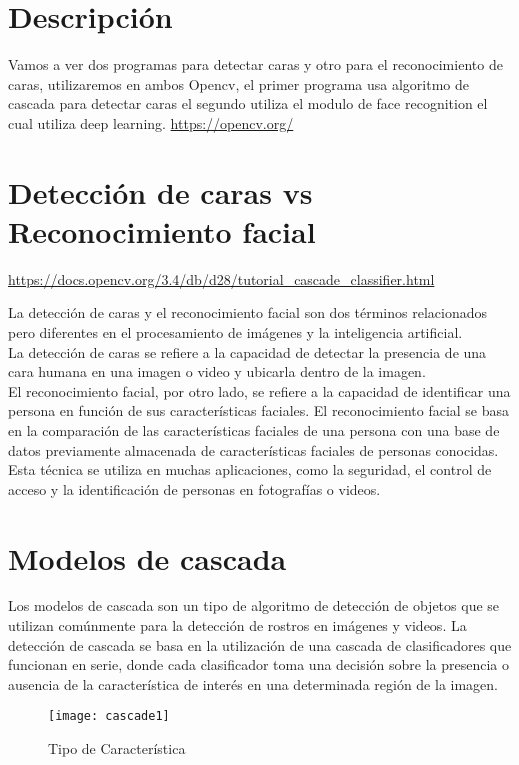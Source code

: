 \section{Descripción}
Vamos a ver dos programas para detectar caras y otro para el reconocimiento de caras,
utilizaremos en ambos Opencv, el primer programa usa algoritmo de cascada para 
detectar caras
el segundo utiliza el modulo de face recognition el cual utiliza deep learning.
\url{https://opencv.org/}

\section{ Detección de caras vs Reconocimiento facial}


\url{https://docs.opencv.org/3.4/db/d28/tutorial_cascade_classifier.html}

La detección de caras y el reconocimiento facial son dos términos relacionados 
pero diferentes en el procesamiento de imágenes y la inteligencia artificial.\\

La detección de caras se refiere a la capacidad de detectar la presencia de una 
cara humana en una imagen o video y ubicarla dentro de la imagen. \\

El reconocimiento facial, por otro lado, se refiere a la capacidad de identificar 
una persona en función de sus características faciales. El reconocimiento facial se 
basa en la comparación de las características faciales de una persona con una base 
de datos previamente almacenada de características faciales de personas conocidas.\\

Esta técnica se utiliza en muchas aplicaciones, como la seguridad, el control 
de acceso y la identificación de personas en fotografías o videos.

\section{Modelos de cascada}
Los modelos de cascada son un tipo de algoritmo de detección de objetos que se 
utilizan comúnmente para la detección de rostros en imágenes y videos. 
La detección de cascada se basa en la utilización de una cascada de 
clasificadores que funcionan en serie, donde cada clasificador toma una 
decisión sobre la presencia o ausencia de la característica de interés en una
 determinada región de la imagen.

\begin{figure}[H]
  \centering
  \texttt{[image: cascade1]}
  \caption{Tipo de Característica}\label{fig:característica}
\end{figure}

